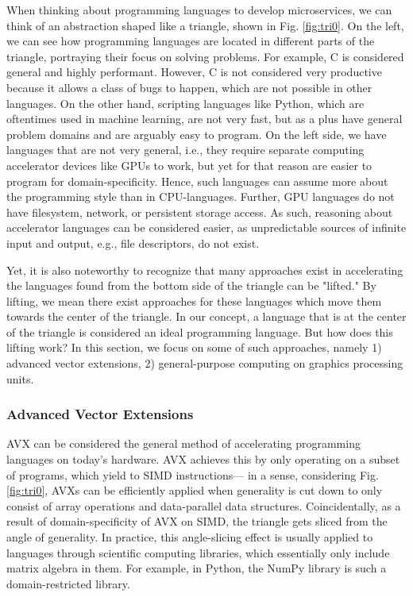 \documentclass{IEEEtran}
\begin{document}
When thinking about programming languages to develop microservices, we can think of an abstraction shaped like a triangle, shown in Fig. \ref{fig:tri0}. On the left, we can see how programming languages are located in different parts of the triangle, portraying their focus on solving problems. For example, C is considered general and highly performant. However, C is not considered very productive because it allows a class of bugs to happen, which are not possible in other languages. On the other hand, scripting languages like Python, which are oftentimes used in machine learning, are not very fast, but as a plus have general problem domains and are arguably easy to program. On the left side, we have languages that are not very general, i.e., they require separate computing accelerator devices like GPUs to work, but yet for that reason are easier to program for domain-specificity. Hence, such languages can assume more about the programming style than in CPU-languages. Further, GPU languages do not have filesystem, network, or persistent storage access. As such, reasoning about accelerator languages can be considered easier, as unpredictable sources of infinite input and output, e.g., file descriptors, do not exist.

Yet, it is also noteworthy to recognize that many approaches exist in accelerating the languages found from the bottom side of the triangle can be "lifted." By lifting, we mean there exist approaches for these languages which move them towards the center of the triangle. In our concept, a language that is at the center of the triangle is considered an ideal programming language. But how does this lifting work? In this section, we focus on some of such approaches, namely 1) advanced vector extensions, 2) general-purpose computing on graphics processing units.

\subsubsection{Advanced Vector Extensions}

\gls{AVX} can be considered the general method of accelerating programming languages on today's hardware. AVX achieves this by only operating on a subset of programs, which yield to \gls{SIMD} instructions— in a sense, considering Fig. \ref{fig:tri0}, \glspl{AVX} can be efficiently applied when generality is cut down to only consist of array operations and data-parallel data structures. Coincidentally, as a result of domain-specificity of AVX on \gls{SIMD}, the triangle gets sliced from the angle of generality. In practice, this angle-slicing effect is usually applied to languages through scientific computing libraries, which essentially only include matrix algebra in them. For example, in Python, the NumPy library is such a domain-restricted library.
\end{document}
